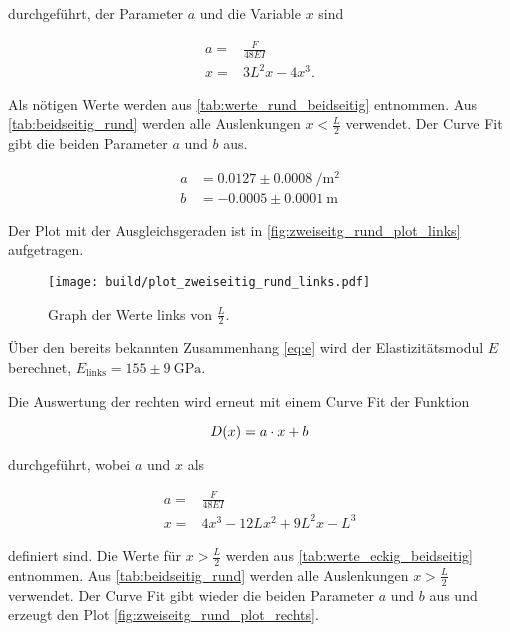 durchgeführt, der Parameter $a$ und die Variable $x$ sind

\begin{align}
    a =& \frac{F}{48EI} \\
    x =& 3L^2x - 4x^3.
\end{align}

Als nötigen Werte werden aus \autoref{tab:werte_rund_beidseitig} entnommen.
Aus \autoref{tab:beidseitig_rund} werden alle Auslenkungen $x < \frac{L}{2}$ verwendet.
Der Curve Fit gibt die beiden Parameter $a$ und $b$ aus.

\begin{align}
    a &= 0.0127 \pm \SI{0.0008}{\per \meter\squared}\\
    b &= -0.0005 \pm \SI{0.0001}{\meter}
\end{align}

Der Plot mit der Ausgleichsgeraden ist in \autoref{fig:zweiseitg_rund_plot_links} aufgetragen.

\begin{figure}
    \centering
    \texttt{[image: build/plot\_zweiseitig\_rund\_links.pdf]}
    \caption{Graph der Werte links von $\frac{L}{2}$.}
    \label{fig:zweiseitg_rund_plot_links}
\end{figure}

Über den bereits bekannten Zusammenhang \autoref{eq:e} wird der Elastizitätsmodul $E$ berechnet, $E_\text{links} = 155 \pm \SI{9}{\giga\pascal}$.

Die Auswertung der rechten wird erneut mit einem Curve Fit der Funktion

\begin{equation}
    D(x) = a \cdot x + b \\
    \label{eq:durchbiegung_beidseitig2}
\end{equation} 

durchgeführt, wobei $a$ und $x$ als  

\begin{align}
    a =& \frac{F}{48EI} \\
    x =& 4x^3 - 12Lx^2 + 9L^2x - L^3
\end{align}

definiert sind.
Die Werte für $x > \frac{L}{2}$ werden aus \autoref{tab:werte_eckig_beidseitig} entnommen.
Aus \autoref{tab:beidseitig_rund} werden alle Auslenkungen $x > \frac{L}{2}$ verwendet.
Der Curve Fit gibt wieder die beiden Parameter $a$ und $b$ aus und erzeugt den Plot \autoref{fig:zweiseitg_rund_plot_rechts}.

